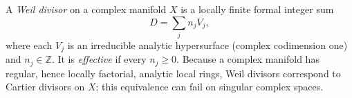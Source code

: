 
A \emph{Weil divisor} on a complex manifold $X$ is a locally finite formal integer sum
\[
D=\sum_j n_jV_j,
\]
where each $V_j$ is an irreducible analytic hypersurface (complex codimension one) and $n_j\in\mathbb Z$. It is \emph{effective} if every $n_j\ge0$. Because a complex manifold has regular, hence locally factorial, analytic local rings, Weil divisors correspond to Cartier divisors on $X$; this equivalence can fail on singular complex spaces.
